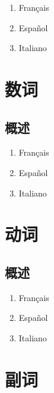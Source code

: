 \documentclass[UTF8,a4paper,titlepage,10pt]{report}
\begin{document}
\begin{enumerate}
\item Français
\label{sec:org4f18ba2}

\item Español
\label{sec:org371c596}

\item Italiano
\label{sec:org3959702}
\end{enumerate}

\chapter{数词}
\label{sec:orgfdee09a}

\section{概述}
\label{sec:org0234cc4}

\begin{enumerate}
\item Français
\label{sec:orgb75e905}

\item Español
\label{sec:org018f470}

\item Italiano
\label{sec:org61cf7b5}
\end{enumerate}

\chapter{动词}
\label{sec:orgfb52b29}

\section{概述}
\label{sec:org61abe9e}

\begin{enumerate}
\item Français
\label{sec:orgedbdd46}

\item Español
\label{sec:orgab497cb}

\item Italiano
\label{sec:org08e8552}
\end{enumerate}

\chapter{副词}
\label{sec:org2a0e292}
\end{document}

